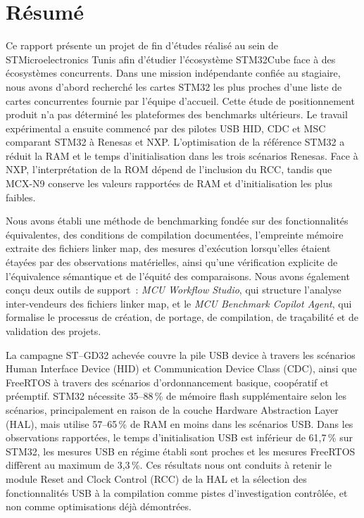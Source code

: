 \chapter*{Résumé}
{}

Ce rapport présente un projet de fin d'études réalisé au sein de STMicroelectronics Tunis
afin d'étudier l'écosystème STM32Cube face à des écosystèmes concurrents. Dans une mission
indépendante confiée au stagiaire, nous avons d'abord recherché les cartes STM32 les plus
proches d'une liste de cartes concurrentes fournie par l'équipe d'accueil. Cette étude de
positionnement produit n'a pas déterminé les plateformes des benchmarks ultérieurs. Le
travail expérimental a ensuite commencé par des pilotes USB HID, CDC et MSC comparant STM32
à Renesas et NXP. L'optimisation de la référence STM32 a réduit la RAM et le temps
d'initialisation dans les trois scénarios Renesas. Face à NXP, l'interprétation de la ROM
dépend de l'inclusion du RCC, tandis que MCX-N9 conserve les valeurs rapportées de RAM et
d'initialisation les plus faibles.

Nous avons établi une méthode de benchmarking fondée sur des
fonctionnalités équivalentes, des conditions de compilation documentées, l'empreinte mémoire
extraite des fichiers linker map, des mesures d'exécution lorsqu'elles étaient étayées par
des observations matérielles, ainsi qu'une vérification explicite de l'équivalence sémantique
et de l'équité des comparaisons. Nous avons également conçu deux outils de support~:
\emph{MCU Workflow Studio}, qui structure l'analyse inter-vendeurs des fichiers linker map,
et le \emph{MCU Benchmark Copilot Agent}, qui formalise le processus de création, de portage,
de compilation, de traçabilité et de validation des projets.

La campagne ST--GD32 achevée couvre la pile USB device à travers les scénarios Human
Interface Device (HID) et Communication Device Class (CDC), ainsi que FreeRTOS à travers des
scénarios d'ordonnancement basique, coopératif et préemptif. STM32 nécessite 35--88\,\% de
mémoire flash supplémentaire selon les scénarios, principalement en raison de la couche
Hardware Abstraction Layer (HAL), mais utilise 57--65\,\% de RAM en moins dans les scénarios
USB. Dans les observations rapportées, le temps d'initialisation USB est inférieur de
61,7\,\% sur
STM32, les mesures USB en régime établi sont proches et les mesures FreeRTOS diffèrent au
maximum de 3,3\,\%. Ces résultats nous ont conduits à retenir le module Reset and Clock
Control (RCC) de la HAL et la sélection des fonctionnalités USB à la compilation comme pistes
d'investigation contrôlée, et non comme optimisations déjà démontrées.

